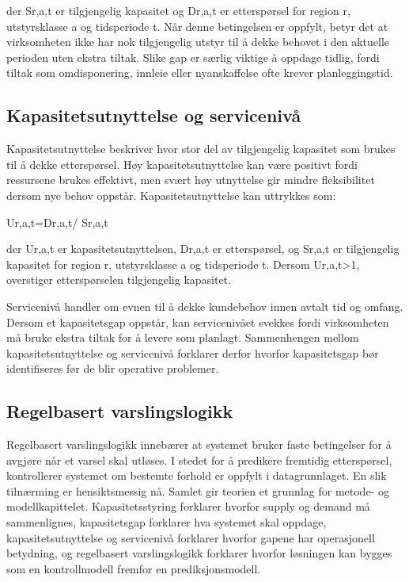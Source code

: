 \documentclass[a4paper,11pt]{article}
\begin{document}
der Sr,a,t er tilgjengelig kapasitet og Dr,a,t er etterspørsel for region r, utstyrsklasse a og tidsperiode t. Når denne betingelsen er oppfylt, betyr det at virksomheten ikke har nok tilgjengelig utstyr til å dekke behovet i den aktuelle perioden uten ekstra tiltak. Slike gap er særlig viktige å oppdage tidlig, fordi tiltak som omdisponering, innleie eller nyanskaffelse ofte krever planleggingstid.

\subsection{Kapasitetsutnyttelse og servicenivå}

Kapasitetsutnyttelse beskriver hvor stor del av tilgjengelig kapasitet som brukes til å dekke etterspørsel. Høy kapasitetsutnyttelse kan være positivt fordi ressursene brukes effektivt, men svært høy utnyttelse gir mindre fleksibilitet dersom nye behov oppstår. Kapasitetsutnyttelse kan uttrykkes som:

Ur,a,t=Dr,a,t/ Sr,a,t

der Ur,a,t er kapasitetsutnyttelsen, Dr,a,t er etterspørsel, og Sr,a,t er tilgjengelig kapasitet for region r, utstyrsklasse a og tidsperiode t. Dersom Ur,a,t>1, overstiger etterspørselen tilgjengelig kapasitet.

Servicenivå handler om evnen til å dekke kundebehov innen avtalt tid og omfang. Dersom et kapasitetsgap oppstår, kan servicenivået svekkes fordi virksomheten må bruke ekstra tiltak for å levere som planlagt. Sammenhengen mellom kapasitetsutnyttelse og servicenivå forklarer derfor hvorfor kapasitetsgap bør identifiseres før de blir operative problemer.

\subsection{Regelbasert varslingslogikk}

Regelbasert varslingslogikk innebærer at systemet bruker faste betingelser for å avgjøre når et varsel skal utløses. I stedet for å predikere fremtidig etterspørsel, kontrollerer systemet om bestemte forhold er oppfylt i datagrunnlaget. En slik tilnærming er hensiktsmessig nå. Samlet gir teorien et grunnlag for metode- og modellkapittelet. Kapasitetsstyring forklarer hvorfor supply og demand må sammenlignes, kapasitetsgap forklarer hva systemet skal oppdage, kapasitetsutnyttelse og servicenivå forklarer hvorfor gapene har operasjonell betydning, og regelbasert varslingslogikk forklarer hvorfor løsningen kan bygges som en kontrollmodell fremfor en prediksjonsmodell.
\end{document}
